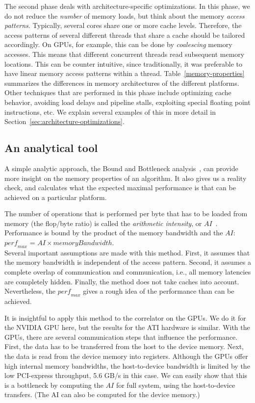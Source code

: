 \documentclass{article}
\begin{document}
The second phase deals with architecture-specific optimizations.
In this phase, we do not reduce the \emph{number} of memory loads, but think about the
memory \emph{access patterns}. Typically, several cores share one or
more cache levels. Therefore, the access patterns of several different
threads that share a cache should be tailored accordingly. On GPUs,
for example, this can be done by \emph{coalescing} memory accesses.
This means that different concurrent threads read subsequent memory
locations.  This can be counter intuitive, since traditionally, it was
preferable to have linear memory access patterns within a
thread. Table~\ref{memory-properties} summarizes the differences in
memory architectures of the different platforms.
Other techniques that are performed in this phase include optimizing cache
behavior, avoiding load delays and pipeline stalls, exploiting special floating point instructions, etc.
We explain several examples of this in more detail in Section~\ref{sec:architecture-optimizations}.


\subsection{An analytical tool}

A simple analytic approach, the Bound and Bottleneck
analysis~\cite{system-performance,roofline}, can provide more insight
on the memory properties of an algorithm. It also gives us a reality
check, and calculates what the expected maximal performance is that can be
achieved on a particular platform.

The number of operations that is performed per byte that has to be
loaded from memory (the flop/byte ratio) is called the \emph{arithmetic intensity}, or
$AI$~\cite{system-performance}.  Performance is bound by the product
of the memory bandwidth and the $AI$: \\
$\mathit{perf_{max}}$ = $AI \times memoryBandwidth$. \\
Several important assumptions are made
with this method. First, it assumes that the memory bandwidth is
independent of the access pattern.  Second, it assumes a complete
overlap of communication and communication, i.e., all memory latencies
are completely hidden.  Finally, the method does not take caches into
account. Nevertheless, the $\mathit{perf_{max}}$ gives a rough idea of
the performance than can be achieved.

It is insightful to apply this method to the correlator on the GPUs.
We do it for the NVIDIA GPU here, but the results for the ATI hardware is similar.
With the GPUs, there are several communication steps that influence
the performance. First, the data has to be transferred from the host to
the device memory.  Next, the data is read from the device memory into
registers. Although the GPUs offer high internal memory bandwidths,
the host-to-device bandwidth is limited by the low
PCI-express throughput, 5.6 GB/s in this case. We can easily show that this is a bottleneck
by computing the $AI$ for full system, using the host-to-device transfers. (The AI can also be computed for
the device memory.)
 
\end{document}
